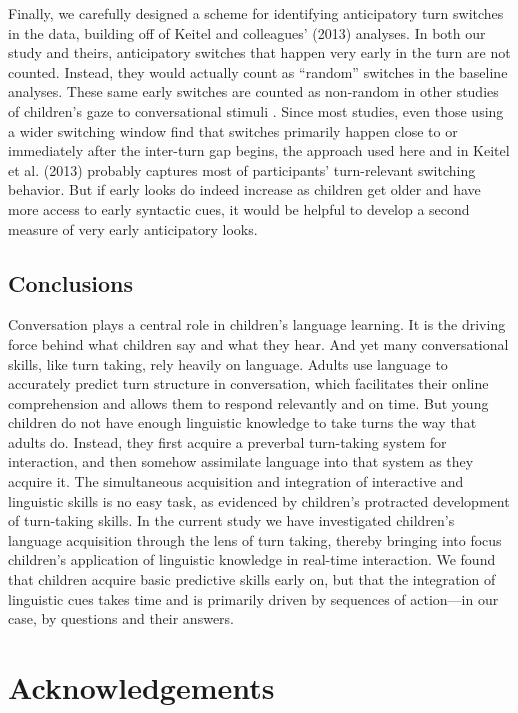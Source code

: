 \documentclass[authoryear, 12pt]{elsarticle}
\begin{document}
Finally, we carefully designed a scheme for identifying anticipatory turn switches in the data, building off of Keitel and colleagues' (2013) analyses. In both our study and theirs, anticipatory switches that happen very early in the turn are not counted. Instead, they would actually count as ``random'' switches in the baseline analyses. These same early switches are counted as non-random in other studies of children's gaze to conversational stimuli \citep{bakker2011, hofsten2009}. Since most studies, even those using a wider switching window \citep[e.g., ][]{hirvenkari2013} find that switches primarily happen close to or immediately after the inter-turn gap begins, the approach used here and in Keitel et al. (2013) probably captures most of participants' turn-relevant switching behavior. But if early looks do indeed increase as children get older and have more access to early syntactic cues, it would be helpful to develop a second measure of very early anticipatory looks.

\subsection{Conclusions}

Conversation plays a central role in children's language learning. It is the driving force behind what children say and what they hear. And yet many conversational skills, like turn taking, rely heavily on language. Adults use language to accurately predict turn structure in conversation, which facilitates their online comprehension and allows them to respond relevantly and on time. But young children do not have enough linguistic knowledge to take turns the way that adults do. Instead, they first acquire a preverbal turn-taking system for interaction, and then somehow assimilate language into that system as they acquire it. The simultaneous acquisition and integration of interactive and linguistic skills is no easy task, as evidenced by children's protracted development of turn-taking skills. In the current study we have investigated children's language acquisition through the lens of turn taking, thereby bringing into focus children's application of linguistic knowledge in real-time interaction. We found that children acquire basic predictive skills early on, but that the integration of linguistic cues takes time and is primarily driven by sequences of action---in our case, by questions and their answers.

\section*{Acknowledgements}
\end{document}
